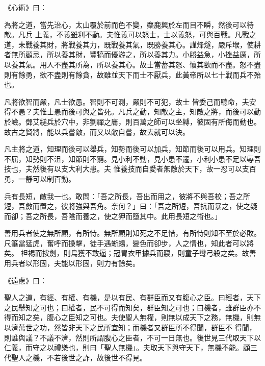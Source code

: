 \begin{pinyinscope}
 《心術》曰：



 為將之道，當先治心，太山覆於前而色不變，麋鹿興於左而目不瞬，然後可以待敵。凡兵
 上義，不義雖利不動。夫惟義可以怒士，士以義怒，可與百戰。凡戰之道，未戰養其財，將戰養其力，既戰養其氣，既勝養其心。謹烽燧，嚴斥堠，使耕者無所顧忌，所以養其財，豐犒而優游之，所以養其力。小勝益急，小挫益厲，所以養其氣。用人不盡其所為，所以養其心。故士當蓄其怒、懷其欲而不盡。怒不盡則有餘勇，欲不盡則有餘貪，故雖並天下而士不厭兵，此黃帝所以七十戰而兵不殆也。



 凡將欲智而嚴，凡士欲愚。智則不可測，嚴則不可犯，故士
 皆委己而聽命，夫安得不愚？夫惟士愚而後可與之皆死。凡兵之動，知敵之主，知敵之將，而後可以動於嶮。鄧艾縋兵於穴中，非劉禪之庸，則百萬之師可以坐縛，彼固有所侮而動也。故古之賢將，能以兵嘗敵，而又以敵自嘗，故去就可以決。



 凡主將之道，知理而後可以舉兵，知勢而後可以加兵，知節而後可以用兵。知理則不屈，知勢則不沮，知節則不窮。見小利不動，見小患不遷，小利小患不足以辱吾技也，夫然後有以支大利大患。夫
 惟養技而自愛者無敵於天下，故一忍可以支百勇，一靜可以制百動。



 兵有長短，敵我一也。敢問：「吾之所長，吾出而用之，彼將不與吾校；吾之所短，吾斂而置之，彼將強與吾角。奈何？」曰：「吾之所短，吾抗而暴之，使之疑而卻；吾之所長，吾陰而養之，使之狎而墮其中。此用長短之術也。」



 善用兵者使之無所顧，有所恃。無所顧則知死之不足惜，有所恃則知不至於必敗。尺箠當猛虎，奮呼而操擊，徒手遇蜥蜴，變色而卻步，人之情也，知此者可以將矣。
 袒裼而按劍，則烏獲不敢逼；冠胄衣甲據兵而寢，則童子彎弓殺之矣。故善用兵者以形固，夫能以形固，則力有餘矣。



 《遠慮》曰：



 聖人之道，有經、有權、有機，是以有民、有群臣而又有腹心之臣。曰經者，天下之民舉知之可也；曰權者，民不可得而知矣，群臣知之可也；曰機者，雖群臣亦不得而知之矣，腹心之臣知之可也。夫使聖人無權，則無以成天下之務，無機，則無以濟萬世之功，然皆非天下之民所宜知；而機者又群臣所不得聞，群臣不
 得聞，則誰與議？不議不濟，然則所謂腹心之臣者，不可一日無也。後世見三代取天下以仁義，而守之以禮樂也，則曰「聖人無機」。夫取天下與守天下，無機不能。顧三代聖人之機，不若後世之詐，故後世不得見。




\end{pinyinscope}
